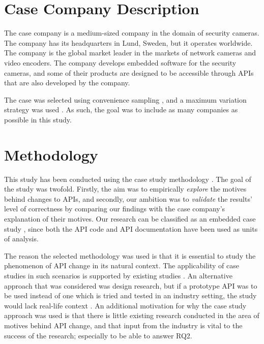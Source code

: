 \documentclass[10pt,twocolumn]{article}
\begin{document}
\section{Case Company Description}
The case company is a medium-sized company in the domain of security cameras. The company has its headquarters in Lund, Sweden, but it operates worldwide. The company is the global market leader in the markets of network cameras and video encoders. The company develops embedded software for the security cameras, and some of their products are designed to be accessible through APIs that are also developed by the company. 


The case was selected using convenience sampling \cite{flyvbjerg2006five}, and a maximum variation strategy was used \cite{benbasat1987case}. As such, the goal was to include as many companies as possible in this study.



\section{Methodology}
This study has been conducted using the case study methodology \cite{runeson2009guidelines}. The goal of the study was twofold. Firstly, the aim was to empirically \textit{explore} the motives behind changes to APIs, and secondly, our ambition was to \textit{validate} the results' level of correctness by comparing our findings with the case company's explanation of their motives. Our research can be classified as an embedded case study \cite{yin2013case}, since both the API code and API documentation have been used as units of analysis. 

The reason the selected methodology was used is that it is essential to study the phenomenon of API change in its natural context. The applicability of case studies in such scenarios is supported by existing studies \cite{runeson2009guidelines} \cite{benbasat1987case} \cite{yin2013case} \cite{robson2002real}. An alternative approach that was considered was design research, but if a prototype API was to be used instead of one which is tried and tested in an industry setting, the study would lack real-life context \cite{runeson2009guidelines}. An additional motivation for why the case study approach was used is that there is little existing research conducted in the area of motives behind API change, and that input from the industry is vital to the success of the research; especially to be able to answer RQ2. 
\end{document}
